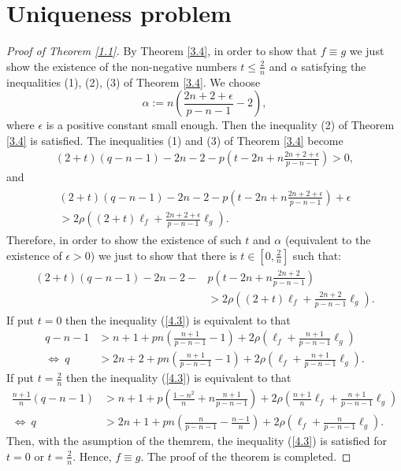 \documentclass[12pt, a4paper, oneside]{amsart}
\numberwithin{equation}{section}
\begin{document}
\section{Uniqueness problem}
\begin{proof}[Proof of Theorem \ref{1.1}] By Theorem \ref{3.4}, in order to show that $f\equiv g$ we just show the existence of the non-negative numbers $t\le\frac{2}{n}$ and $\alpha$ satisfying the inequalities (1), (2), (3) of Theorem \ref{3.4}. We choose
$$ \alpha:=n\left(\frac{2n+2+\epsilon}{p-n-1}-2\right),$$
where $\epsilon$ is a positive constant small enough. Then the inequality (2) of Theorem \ref{3.4} is satisfied. The inequalities (1) and (3) of Theorem \ref{3.4} become
\begin{align}\label{4.1}
(2+t)(q-n-1)-2n-2-p\left(t-2n+n\frac{2n+2+\epsilon}{p-n-1}\right)> 0,
\end{align}
and
\begin{align}
\label{4.2}
\begin{split}
(2+t)(q-n-1)-2n-2-p\left(t-2n+n\frac{2n+2+\epsilon}{p-n-1}\right)+\epsilon\\
>2\rho\left((2+t)\ell_f+\frac{2n+2+\epsilon}{p-n-1}\ell_g\right).
\end{split}
\end{align}
Therefore, in order to show the existence of such $t$ and $\alpha$ (equivalent to the existence of $\epsilon >0$) we just to show that there is $t\in[0,\frac{2}{n}]$ such that:
\begin{align}
\label{4.3}
\begin{split}
(2+t)(q-n-1)-2n-2-&p\left(t-2n+n\frac{2n+2}{p-n-1}\right)\\
&>2\rho\left((2+t)\ell_f+\frac{2n+2}{p-n-1}\ell_g\right).
\end{split}
\end{align}
If put $t=0$ then the inequality (\ref{4.3}) is equivalent to that 
\begin{align*}
q-n-1&>n+1+pn\left(\frac{n+1}{p-n-1}-1\right)+2\rho\left(\ell_f+\frac{n+1}{p-n-1}\ell_g\right)\\ 
\Leftrightarrow\ q&>2n+2+pn\left(\frac{n+1}{p-n-1}-1\right)+2\rho\left(\ell_f+\frac{n+1}{p-n-1}\ell_g\right).
\end{align*}
If put $t=\frac{2}{n}$ then the inequality (\ref{4.3}) is equivalent to that 
\begin{align*}
\frac{n+1}{n}(q-n-1)&>n+1+p\left(\frac{1-n^2}{n}+n\frac{n+1}{p-n-1}\right)+2\rho\left(\frac{n+1}{n}\ell_f+\frac{n+1}{p-n-1}\ell_g\right)\\
\Leftrightarrow\ q&>2n+1+pn\left(\frac{n}{p-n-1}-\frac{n-1}{n}\right)+2\rho\left(\ell_f+\frac{n}{p-n-1}\ell_g\right).
\end{align*}
Then, with the asumption of the themrem, the inequality (\ref{4.3}) is satisfied for $t=0$ or $t=\frac{2}{n}$. Hence, $f\equiv g$.
The proof of the theorem is completed.
\end{proof}
\end{document}
